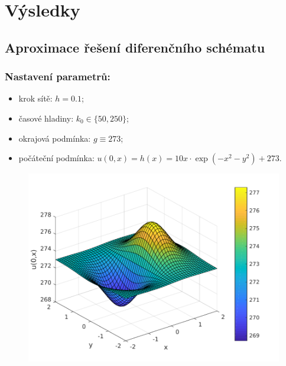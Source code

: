 \section{Výsledky}

\subsection{Aproximace řešení diferenčního schématu}

\begin{frame}\frametitle{Nastavení parametrů:}
\begin{block}{}
\begin{itemize}
	\item krok sítě: $h=0.1$;
	\item časové hladiny: $k_{0}\in\{50,250\}$;
	\item okrajová podmínka: $g\equiv 273$;
	\item počáteční podmínka: $u(0,x)=h(x)=10x\cdot\exp(-x^2-y^2)+273$.
\end{itemize}
\end{block}

\begin{figure}[ht!]
\centering
\includegraphics[width=0.55\linewidth]{../../results/initial_condition/initial_condition}
\label{fig:initial_condition}
\end{figure}

\end{frame}

